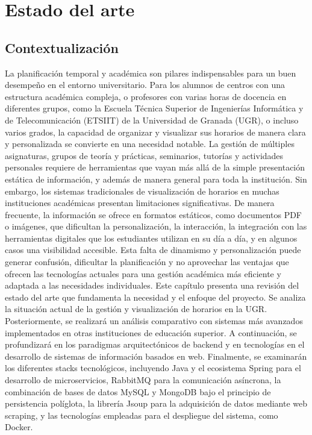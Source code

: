 \chapter{Estado del arte}\label{cap:estado}

\section{Contextualización}

La planificación temporal y académica son pilares indispensables para un buen desempeño en el entorno universitario. Para los alumnos de centros con una estructura académica compleja, o profesores con varias horas de docencia en diferentes grupos, como la Escuela Técnica Superior de Ingenierías Informática y de Telecomunicación (ETSIIT) de la Universidad de Granada (UGR), o incluso varios grados, la capacidad de organizar y visualizar sus horarios de manera clara y personalizada se convierte en una necesidad notable.
\newline\newline
La gestión de múltiples asignaturas, grupos de teoría y prácticas, seminarios, tutorías y actividades personales requiere de herramientas que vayan más allá de la simple presentación estática de información, y además de manera general para toda la institución.
\newline\newline
Sin embargo, los sistemas tradicionales de visualización de horarios en muchas instituciones académicas presentan limitaciones significativas. De manera frecuente, la información se ofrece en formatos estáticos, como documentos PDF o imágenes, que dificultan la personalización, la interacción, la integración con las herramientas digitales que los estudiantes utilizan en su día a día, y en algunos casos una visibilidad accesible.
\newline\newline
Esta falta de dinamismo y personalización puede generar confusión, dificultar la planificación y no aprovechar las ventajas que ofrecen las tecnologías actuales para una gestión académica más eficiente y adaptada a las necesidades individuales.
\newline\newline
Este capítulo presenta una revisión del estado del arte que fundamenta la necesidad y el enfoque del proyecto. Se analiza la situación actual de la gestión y visualización de horarios en la UGR. 
Posteriormente, se realizará un análisis comparativo con sistemas más avanzados implementados en otras instituciones de educación superior. A continuación, se profundizará en los paradigmas arquitectónicos de backend y en tecnologías en el desarrollo de sistemas de información basados en web. Finalmente, se examinarán los diferentes stacks tecnológicos, incluyendo Java y el ecosistema Spring para el desarrollo de microservicios, RabbitMQ para la comunicación asíncrona, la combinación de bases de datos MySQL y MongoDB bajo el principio de persistencia políglota, la librería Jsoup para la adquisición de datos mediante web scraping, y las tecnologías empleadas para el despliegue del sistema, como Docker.

